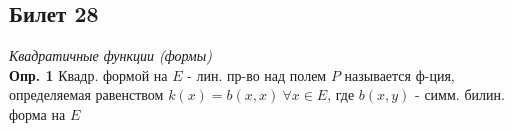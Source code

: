 \subsection{Билет 28}

\textit{Квадратичные функции (формы)}\\

\textbf{Опр. 1} Квадр. формой на $E$ - лин. пр-во над полем $P$ называется ф-ция, определяемая равенством $k(x)=b(x,x)\ \forall x\in E$, где $b(x,y)$ - симм. билин. форма на $E$




